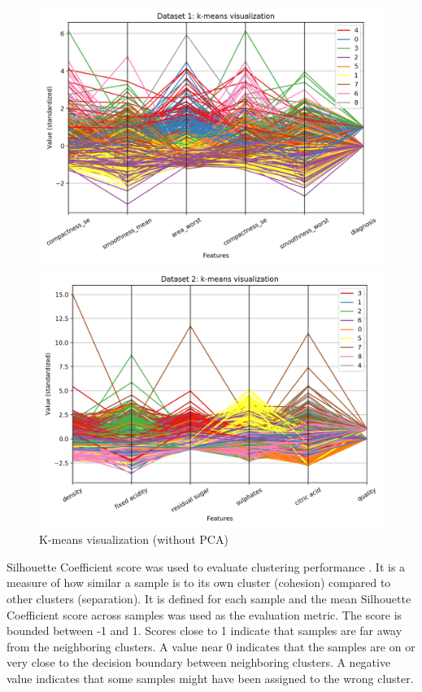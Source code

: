 \documentclass[letterpaper]{article}
\begin{document}
	\begin{figure}
		\centering
		\begin{minipage}{.5\textwidth}
			\centering
			\includegraphics[width=\linewidth]{../../plots/kmeans_viz_1}
		\end{minipage}%
		\begin{minipage}{.5\textwidth}
			\centering
			\includegraphics[width=\linewidth]{../../plots/kmeans_viz_2}
		\end{minipage}
		\caption{K-means visualization (without PCA)}
		\label{fig:kmeans_viz}
	\end{figure}
	
	Silhouette Coefficient score was used to evaluate clustering performance \cite{rousseeuwSilhouettesGraphicalAid1987}. It is a measure of how similar a sample is to its own cluster (cohesion) compared to other clusters (separation). It is defined for each sample and the mean Silhouette Coefficient score across samples was used as the evaluation metric. The score is bounded between -1 and 1. Scores close to 1 indicate that samples are far away from the neighboring clusters. A value near 0 indicates that the samples are on or very close to the decision boundary between neighboring clusters. A negative value indicates that some samples might have been assigned to the wrong cluster.
	
\end{document}
